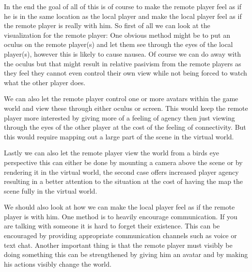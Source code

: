 	In the end the goal of all of this is of course to make the remote player feel
	as if he is in the same location as the local player and make the local player feel
	as if the remote player is really with him. So first of all we can look at the
	visualization for the remote player:
	One obvious method might be to put an oculus on the remote player(s) and let
	them see through the eyes of the local player(s), however this is likely to cause nausea.
	Of course we can do away with the oculus but that might result in relative pasivism from
	the remote players as they feel they cannot
	even control their own view while not being forced to watch what the other player does.

	We can also let the remote player control one or more avatars within the game world
	and view these through either oculus or screen. This would keep the remote player
	more interested by giving more of a feeling of agency then just viewing through the eyes
	of the other player at the cost of the feeling of connectivity. But this would require
	mapping out a large part of the scene in the virtual world.

	Lastly we can also let the remote player view the world from a birds eye perspective
	this can either be done by mounting a camera above the scene or by rendering it in
	the virtual world, the second case offers increased player agency resulting in
	a better attention to the situation at the cost of having the map the scene fully
	in the virtual world.

	We should also look at how we can make the local player feel as if the remote
	player is with him. One method is to heavily encourage communication. If you
	are talking with someone it is hard to forget their existence. This can be
	encouraged by providing appropriate communication channels such as voice or text
	chat. Another important thing is that the remote player must visibly be doing something
	this can be strengthened by giving him an avatar and by making his actions visibly
	change the world.
